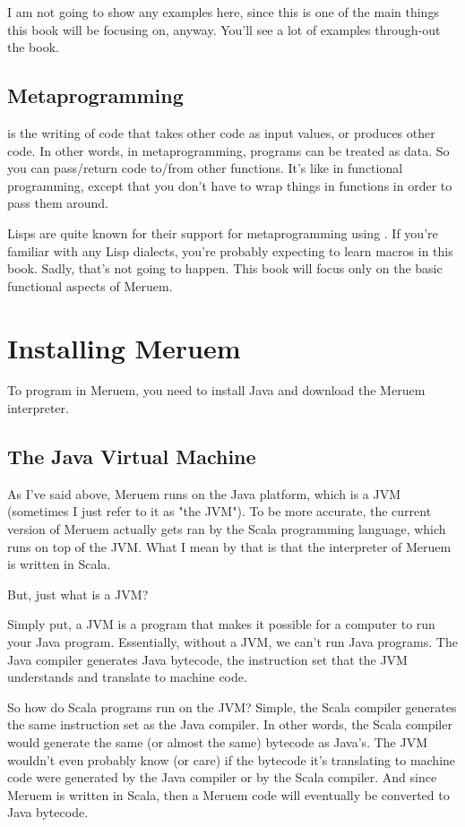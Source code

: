 I am not going to show any examples here, since this is one of the main things this book will be focusing on, anyway. You'll see a lot of examples through-out the book.

\subsection{Metaprogramming}
 is the writing of code that takes other code as input values, or produces other code. In other words, in metaprogramming, programs can be treated as data. So you can pass/return code to/from other functions. It's like in functional programming, except that you don't have to wrap things in functions in order to pass them around. 

Lisps are quite known for their support for metaprogramming using . If you're familiar with any Lisp dialects, you're probably expecting to learn macros in this book. Sadly, that's not going to happen. This book will focus only on the basic functional aspects of Meruem. 

\section{Installing Meruem}
\label{sec:installing-meruem}
To program in Meruem, you need to install Java and download the Meruem interpreter.

\subsection{The Java Virtual Machine}
As I've said above, Meruem runs on the Java platform, which is a JVM (sometimes I just refer to it as "the JVM"). To be more accurate, the current version of Meruem actually gets ran by the Scala programming language, which runs on top of the JVM. What I mean by that is that the interpreter of Meruem is written in Scala. 

But, just what is a JVM? 

Simply put, a JVM is a program that makes it possible for a computer to run your Java program. Essentially, without a JVM, we can't run Java programs. The Java compiler generates Java bytecode, the instruction set that the JVM understands and translate to machine code.

So how do Scala programs run on the JVM? Simple, the Scala compiler generates the same instruction set as the Java compiler. In other words, the Scala compiler would generate the same (or almost the same) bytecode as Java's. The JVM wouldn't even probably know (or care) if the bytecode it's translating to machine code were generated by the Java compiler or by the Scala compiler. And since Meruem is written in Scala, then a Meruem code will eventually be converted to Java bytecode. 


